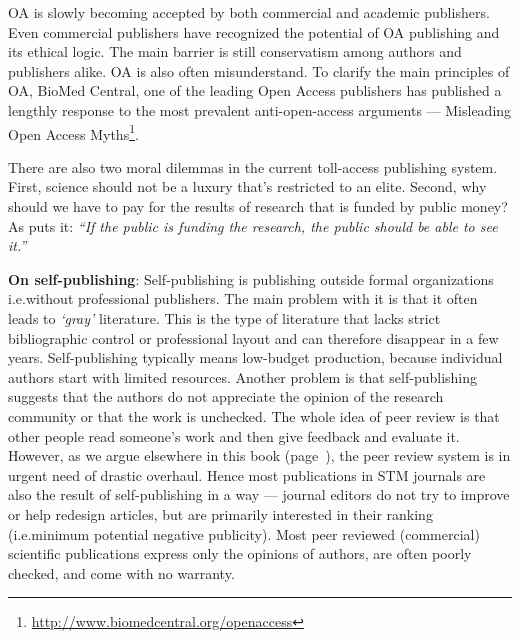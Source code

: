 \documentclass[graybox,envcountchap,sectrefs,UStrade]{svmono}
\newenvironment{fminipage}{\begin{Sbox}\begin{minipage}}{\end{minipage}\end{Sbox}\fbox{\TheSbox}}
\begin{document}
OA is slowly becoming accepted by both commercial and academic publishers. Even commercial publishers have recognized the potential of OA publishing and its ethical logic. The main barrier is still conservatism among authors and publishers alike. OA is also often misunderstand. To clarify the main principles of OA, BioMed Central, one of the leading Open Access publishers has published a lengthly response to the most prevalent anti-open-access arguments --- Misleading Open Access Myths\footnote{\url{http://www.biomedcentral.org/openaccess}}. \par

There are also two moral dilemmas in the current toll-access publishing system. First, science should not be a luxury that's restricted to an elite. Second, why should we have to pay for the results of research that is funded by public money? As \citet{Kleiner2011} puts it: \emph{``If the public is funding the research, the public should be able to see it.''} \par

\bigskip
\begin{fminipage}{.9\textwidth}{\footnotesize{\textsf{\textbf{On self-publishing}}:
Self-publishing is publishing outside formal organizations i.e.\@ without professional publishers. The main problem with it is that it often leads to \emph{`gray'} literature. This is the type of literature that lacks strict bibliographic control or professional layout and can therefore disappear in a few years. Self-publishing typically means low-budget production, because individual authors start with limited resources. Another problem is that self-publishing suggests that the authors do not appreciate the opinion of the research community or that the work is unchecked. The whole idea of peer review is that other people read someone's work and then give feedback and evaluate it. However, as we argue elsewhere in this book (page~\pageref{sec:missingreviewers}), the peer review system is in urgent need of drastic overhaul. Hence most publications in STM journals are also the result of self-publishing in a way --- journal editors do not try to improve or help redesign articles, but are primarily interested in their ranking (i.e.\@ minimum potential negative publicity). Most peer reviewed (commercial) scientific publications express only the opinions of authors, are often poorly checked, and come with no warranty. } }
\end{fminipage}
\bigskip
\end{document}
